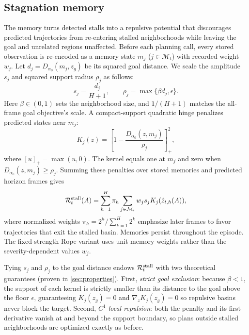\subsection{Stagnation memory}
\label{sec:memory}
The memory turns detected stalls into a repulsive potential that discourages predicted trajectories from re-entering stalled neighborhoods while leaving the goal and unrelated regions unaffected. Before each planning call, every stored observation is re-encoded as a memory state $m_j$ ($j\in\mathcal M_t$) with recorded weight $w_j$. Let $d_j=D_{\alpha_0}(m_j,z_g)$ be its squared goal distance. We scale the amplitude $s_j$ and squared support radius $\rho_j$ as follows:
\begin{equation}
 s_j=\frac{d_j}{H+1},\qquad
 \rho_j=\max\{\beta d_j,\epsilon\}.
 \label{eq:memoryscale}
\end{equation}
Here $\beta\in(0,1)$ sets the neighborhood size, and $1/(H+1)$ matches the all-frame goal objective's scale. A compact-support quadratic hinge penalizes predicted states near $m_j$:
\begin{equation}
 K_j(z)=\left[1-\frac{D_{\alpha_0}(z,m_j)}{\rho_j}\right]_+^2,
 \label{eq:kernel}
\end{equation}
where $[u]_+=\max(u,0)$. The kernel equals one at $m_j$ and zero when $D_{\alpha_0}(z,m_j)\geq\rho_j$. Summing these penalties over stored memories and predicted horizon frames gives
\begin{equation}
 \mathcal R_t^{\rm stall}(A)
 =\sum_{h=1}^{H}\pi_h
 \sum_{j\in\mathcal M_t}w_js_jK_j(\hat z_{t,h}(A)),
 \label{eq:penalty}
\end{equation}
where normalized weights $\pi_h=2^h/\sum_{k=1}^{H}2^k$ emphasize later frames to favor trajectories that exit the stalled basin. Memories persist throughout the episode. The fixed-strength Rope variant uses unit memory weights rather than the severity-dependent values $w_j$.

Tying $s_j$ and $\rho_j$ to the goal distance endows $\mathcal R_t^{\rm stall}$ with two theoretical guarantees (proven in \cref{sec:properties}). First, \emph{strict goal exclusion}: because $\beta<1$, the support of each kernel is strictly smaller than its distance to the goal above the floor $\epsilon$, guaranteeing $K_j(z_g)=0$ and $\nabla_z K_j(z_g)=0$ so repulsive basins never block the target. Second, \emph{$C^1$ local repulsion}: both the penalty and its first derivative vanish at and beyond the support boundary, so plans outside stalled neighborhoods are optimized exactly as before.

